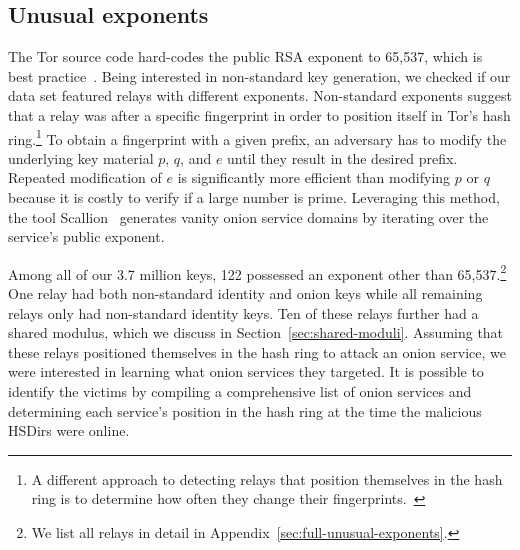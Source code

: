 \subsection{Unusual exponents}
\label{sec:unusual-exponents}
The Tor source code hard-codes the public RSA exponent to 65,537, which is best
practice~\cite[\S~4]{Boneh1999a}.  Being interested in non-standard key
generation, we checked if our data set featured relays with different
exponents.  Non-standard exponents suggest that a relay was after a specific
fingerprint in order to position itself in Tor's hash ring.\footnote{A different
approach to detecting relays that position themselves in the hash ring is to
determine how often they change their
fingerprints.~\cite[\S~4.3.3]{Winter2016a}} To obtain a fingerprint with a given
prefix, an adversary has to modify the underlying key material $p$, $q$, and $e$
until they result in the desired prefix.  Repeated modification of $e$ is
significantly more efficient than modifying $p$ or $q$ because it is costly to
verify if a large number is prime.  Leveraging this method, the tool
Scallion~\cite{scallion} generates vanity onion service domains by iterating
over the service's public exponent.

Among all of our 3.7 million keys, 122 possessed an exponent other than
65,537.\footnote{We list all relays in detail in
Appendix~\ref{sec:full-unusual-exponents}.} One relay had both 
non-standard identity and onion keys while all remaining relays only had
non-standard identity keys.  Ten of these relays further had a shared modulus,
which we discuss in Section~\ref{sec:shared-moduli}.  Assuming that these relays
positioned themselves in the hash ring to attack an onion service, we were
interested in learning what onion services they targeted.  It is possible to
identify the victims by compiling a comprehensive list of onion services and
determining each service's position in the hash ring at the time the malicious
HSDirs were online.

